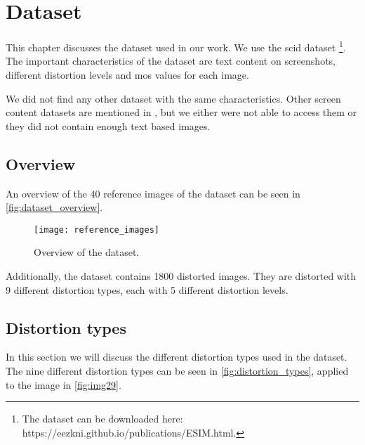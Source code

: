 \chapter{Dataset}
\label{ch:dataset}
This chapter discusses the dataset used in our work. We use the \gls{scid} dataset \cite{ni_esim_2017}\footnote{The dataset can be downloaded here: https://eezkni.github.io/publications/ESIM.html.}.
The important characteristics of the dataset are text content on screenshots, different distortion levels and \gls{mos} values for each image.


We did not find any other dataset with the same characteristics.
Other screen content datasets are mentioned in \cite{iqa_survey_2020}, but we either were not able to access them or they did not contain enough text based images.

\section{Overview}
\label{sec:dataset_overview}
An overview of the 40 reference images of the dataset can be seen in \autoref{fig:dataset_overview}.

\begin{figure}[h]
    \centering
    \texttt{[image: reference\_images]}
    \caption{Overview of the dataset.}
    \label{fig:dataset_overview}
\end{figure}

Additionally, the dataset contains 1800 distorted images.
They are distorted with 9 different distortion types, each with 5 different distortion levels.

\section{Distortion types}
\label{sec:dataset_distortion_types}

In this section we will discuss the different distortion types used in the dataset.
The nine different distortion types can be seen in \autoref{fig:distortion_types}, applied to the image in \autoref{fig:img29}.

